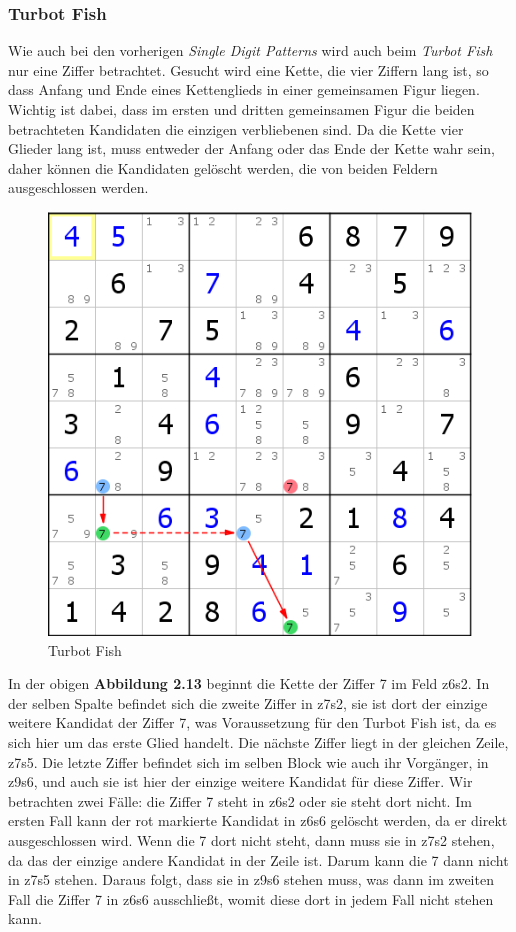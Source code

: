 \newpage
\subsubsection{Turbot Fish}
Wie auch bei den vorherigen \textit{Single Digit Patterns} wird auch beim \textit{Turbot Fish} nur eine Ziffer betrachtet. Gesucht wird eine Kette, die vier Ziffern lang ist, so dass Anfang und Ende eines Kettenglieds in einer gemeinsamen Figur liegen. Wichtig ist dabei, dass im ersten und dritten gemeinsamen Figur die beiden betrachteten Kandidaten die einzigen verbliebenen  sind. Da die Kette vier Glieder lang ist, muss entweder der Anfang oder das Ende der Kette wahr sein, daher können die Kandidaten gelöscht werden, die von beiden Feldern ausgeschlossen werden.

\begin{figure}[h]
\begin{center}
\includegraphics{./img/turbot_fish.png}
\caption{Turbot Fish}
\end{center}
\end{figure}

\noindent In der obigen \textbf{Abbildung 2.13} beginnt die Kette der Ziffer 7 im Feld z6s2. In der selben Spalte befindet sich die zweite Ziffer in z7s2, sie ist dort der einzige weitere Kandidat der Ziffer 7, was Voraussetzung für den Turbot Fish ist, da es sich hier um das erste Glied handelt. Die nächste Ziffer liegt in der gleichen Zeile, z7s5. Die letzte Ziffer befindet sich im selben Block wie auch ihr Vorgänger, in z9s6, und auch sie ist hier der einzige weitere Kandidat für diese Ziffer. Wir betrachten zwei Fälle: die Ziffer 7 steht in z6s2 oder sie steht dort nicht. Im ersten Fall kann der rot markierte Kandidat in z6s6 gelöscht werden, da er direkt ausgeschlossen wird. Wenn die 7 dort nicht steht, dann muss sie in z7s2 stehen, da das der einzige andere Kandidat in der Zeile ist. Darum kann die 7 dann nicht in z7s5 stehen. Daraus folgt, dass sie in z9s6 stehen muss, was dann im zweiten Fall die Ziffer 7 in z6s6 ausschließt, womit diese dort in jedem Fall nicht stehen kann.